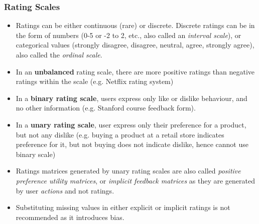 \documentclass{article}
\begin{document}
\subsubsection{Rating Scales}
\begin{itemize}

    \item Ratings can be either continuous (rare) or discrete. Discrete ratings can be in the form of numbers (0-5 or -2 to 2, etc., also called an \textit{interval scale}), or categorical values (strongly disagree, disagree, neutral, agree, strongly agree), also called the \textit{ordinal scale}. 
    
    \item In an \textbf{unbalanced} rating scale, there are more positive ratings than negative ratings within the scale (e.g. Netflix rating system)
    
    \item In a \textbf{binary rating scale}, users express only like or dislike behaviour, and no other information (e.g. Stanford course feedback form).
    
    \item In a \textbf{unary rating scale}, user express only their preference for a product, but not any dislike (e.g. buying a product at a retail store indicates preference for it, but not buying does not indicate dislike, hence cannot use binary scale)
    
    \item Ratings matrices generated by unary rating scales are also called \textit{positive preference utility matrices}, or \textit{implicit feedback matrices} as they are generated by user \textit{actions} and not ratings. 
    
    \item Substituting missing values in either explicit or implicit ratings is not recommended as it introduces bias.
\end{itemize}
\end{document}

